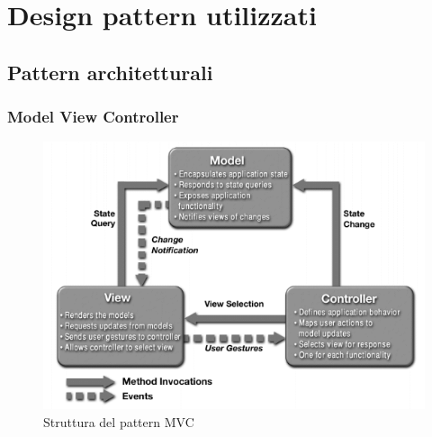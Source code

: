 \newcommand{\utilizzo}{\item \textbf{Utilizzo nel progetto}}

\section{Design pattern utilizzati}
\label{pattern}
\subsection{Pattern architetturali}
	\subsubsection{Model View Controller}
	
		\begin{figure}[!h]
			\centering
			\includegraphics[scale=0.5]{img/mvc}  
			\caption{Struttura del pattern MVC}
		\end{figure}
		
